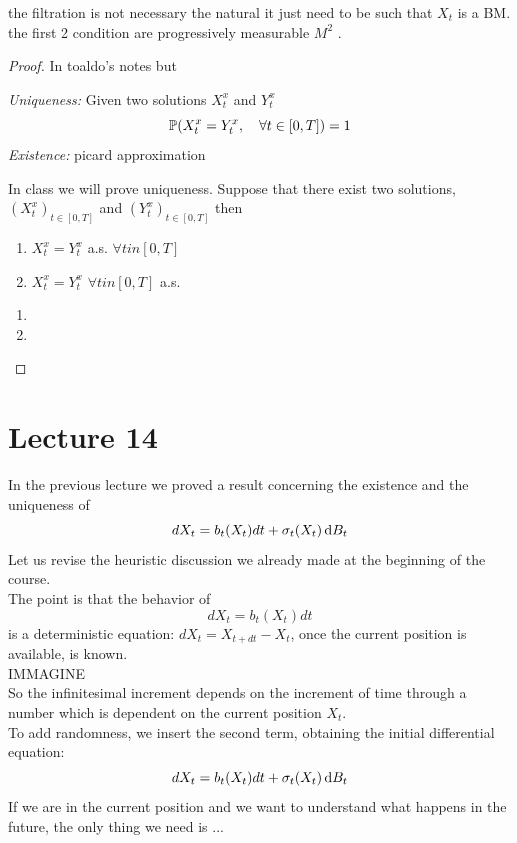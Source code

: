 the filtration is not necessary the natural it just need to be such that $X_t$ is a BM. the first 2 condition are progressively measurable $M^2$ . 
\begin{proof}
	In toaldo's notes but 
	\begin{remark} %
		\emph{Uniqueness:} Given two solutions $X_t^x$ and $Y_t^x$ 
		\begin{equation*}
			\mathbb{P}(X_t^x = Y_t^x, \quad \forall t \in [0,T])=1
		\end{equation*}
		\emph{Existence:} picard approximation
	\end{remark}
	In class we will prove uniqueness. Suppose that there exist two solutions, $(X_t^x)_{t \in [0,T]}$ and $(Y_t^x)_{t \in [0,T]}$ then 
	\begin{enumerate}
		\item $X_t^x = Y_t^x$ a.s. $ \forall t in [0,T ]$
        \item $X_t^x = Y_t^x$ $ \forall t in [0,T ]$ a.s. 
	\end{enumerate}
 \begin{enumerate}
     \item 



     \item 
 \end{enumerate}
\end{proof}








\section{Lecture 14}
In the previous lecture we proved a result concerning the existence and the uniqueness of
\begin{equation*}
    dX_t = b_t(X_t) dt + \sigma_t(X_t) \mathop{}\!\mathrm{d} B_t
\end{equation*}
Let us revise the heuristic discussion we already made at the beginning of the course. \\
The point is that the behavior of
\begin{equation*}
    dX_t = b_t(X_t) dt 
\end{equation*}
is a deterministic equation: $dX_t = X_{t+dt} - X_t$, once the current position is available, is known. \\
IMMAGINE \\
So the infinitesimal increment depends on the increment of time through a number which is dependent on the current position $X_t$. \\
To add randomness, we insert the second term, obtaining the initial differential equation: 
\begin{equation*}
    dX_t = b_t(X_t) dt + \sigma_t(X_t) \mathop{}\!\mathrm{d} B_t
\end{equation*}
If we are in the current position and we want to understand what happens in the future, the only thing we need is ... 

